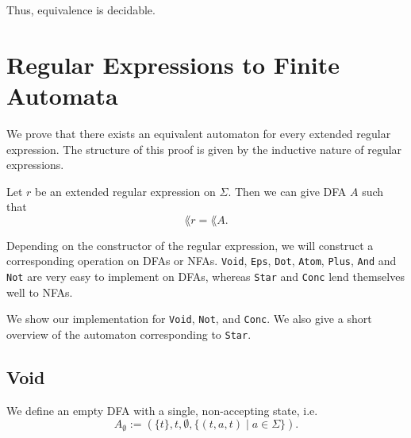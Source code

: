     Thus, equivalence is decidable.    



 


\section{Regular Expressions to Finite Automata}
We prove that there exists an equivalent automaton for every extended regular expression.
The structure of this proof is given by the inductive nature of regular expressions.

\begin{theorem}
    \label{re_to_dfa}
    Let $r$ be an extended regular expression on $\Sigma$. Then we can give DFA $A$ such that
    \begin{equation*}
        \lang{r} = \lang{A}.
    \end{equation*}
\end{theorem}

Depending on the constructor of the regular expression, we will construct a corresponding operation on DFAs or NFAs.
\lstinline{Void}, \lstinline{Eps}, \lstinline{Dot}, \lstinline{Atom}, \lstinline{Plus}, \lstinline{And} and \lstinline{Not} are very easy to implement on DFAs, whereas \lstinline{Star} and \lstinline{Conc} lend themselves well to NFAs.

We show our implementation for \lstinline{Void}, \lstinline{Not}, and \lstinline{Conc}.
We also give a short overview of the automaton corresponding to \lstinline{Star}. 


\subsection{Void}
\begin{definition}
    We define an empty DFA with a single, non-accepting state, i.e.
    \begin{equation*}
        A_\emptyset := (\{t\}, t, \emptyset, \{(t, a, t) \; | \; a \in \Sigma\}).
    \end{equation*}
\end{definition}

